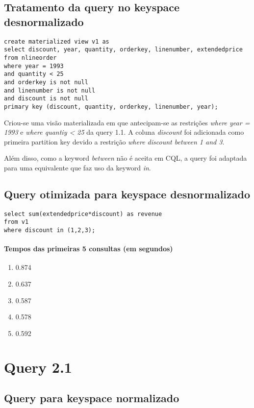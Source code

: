 \documentclass[12pt]{article}
\begin{document}
\subsection{Tratamento da query no keyspace desnormalizado}

\begin{lstlisting}
create materialized view v1 as 
select discount, year, quantity, orderkey, linenumber, extendedprice
from nlineorder
where year = 1993 
and quantity < 25
and orderkey is not null
and linenumber is not null
and discount is not null
primary key (discount, quantity, orderkey, linenumber, year);

\end{lstlisting}

Criou-se uma visão materializada em que antecipam-se as restrições \emph{where year = 1993} e \emph{where quantiy < 25} da query 1.1. A coluna \emph{discount} foi adicionada como primeira partition key devido a restrição \emph{where discount between 1 and 3}.

Além disso, como a keyword \emph{between} não é aceita em CQL, a query foi adaptada para uma equivalente que faz uso da keyword \emph{in}.

\subsection{Query otimizada para keyspace desnormalizado}

\begin{lstlisting}
select sum(extendedprice*discount) as revenue
from v1
where discount in (1,2,3);
\end{lstlisting}

\paragraph{Tempos das primeiras 5 consultas (em segundos)}
\begin{enumerate}
\item 0.874 
\item 0.637 
\item 0.587 
\item 0.578 
\item 0.592
\end{enumerate}

\section{Query 2.1}

\subsection{Query para keyspace normalizado}
\end{document}
